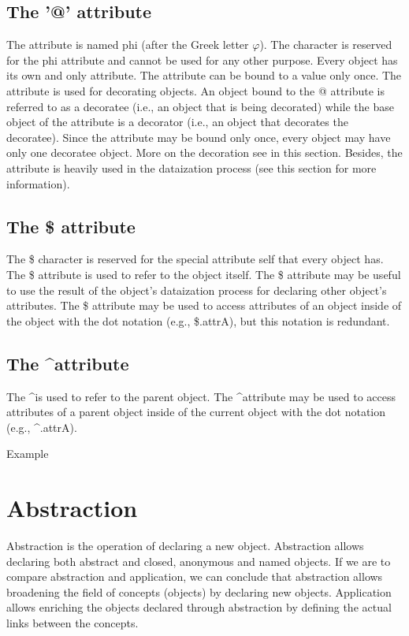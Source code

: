 \documentclass[12pt]{book}
\begin{document}
\subsection{The '@' attribute}
The \@ attribute is named phi (after the Greek letter $\varphi$). The \@ character is reserved for the phi attribute and cannot be used for any other purpose. Every object has its own and only \@ attribute. The \@ attribute can be bound to a value only once.
The \@ attribute is used for decorating objects. An object bound to the @ attribute is referred to as a decoratee (i.e., an object that is being decorated) while the base object of the \@ attribute is a decorator (i.e., an object that decorates the decoratee). Since the \@ attribute may be bound only once, every object may have only one decoratee object. More on the decoration see in this section.
Besides, the \@ attribute is heavily used in the dataization process (see this section for more information).

\subsection{The \$ attribute}
The \$ character is reserved for the special attribute self that every object has. The \$ attribute is used to refer to the object itself.
The \$ attribute may be useful to use the result of the object's dataization process for declaring other object's attributes.
The \$ attribute may be used to access attributes of an object inside of the object with the dot notation (e.g., \$.attrA), but this notation is redundant.

\subsection{The \textasciicircum attribute}
The  \textasciicircum is used to refer to the parent object.
The \textasciicircum attribute may be used to access attributes of a parent object inside of the current object with the dot notation (e.g., \textasciicircum.attrA).

Example

\section{Abstraction}
Abstraction is the operation of declaring a new object. Abstraction allows declaring both abstract and closed, anonymous and named objects.
If we are to compare abstraction and application, we can conclude that abstraction allows broadening the field of concepts (objects) by declaring new objects. Application allows enriching the objects declared through abstraction by defining the actual links between the concepts.
\end{document}
